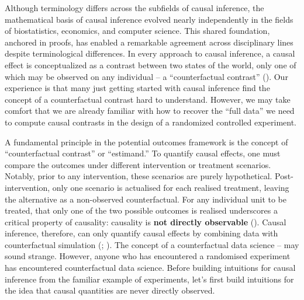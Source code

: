 \documentclass[
  singlecolumn]{article}
\begin{document}
Although terminology differs across the subfields of causal inference,
the mathematical basis of causal inference evolved nearly independently
in the fields of biostatistics, economics, and computer science. This
shared foundation, anchored in proofs, has enabled a remarkable
agreement across disciplinary lines despite terminological differences.
In every approach to causal inference, a causal effect is conceptualized
as a contrast between two states of the world, only one of which may be
observed on any individual -- a ``counterfactual contrast''
(). Our
experience is that many just getting started with causal inference find
the concept of a counterfactual contrast hard to understand. However, we
may take comfort that we are already familiar with how to recover the
``full data'' we need to compute causal contrasts in the design of a
randomized controlled experiment.

A fundamental principle in the potential outcomes framework is the
concept of ``counterfactual contrast'' or ``estimand.'' To quantify
causal effects, one must compare the outcomes under different
intervention or treatment scenarios. Notably, prior to any intervention,
these scenarios are purely hypothetical. Post-intervention, only one
scenario is actualised for each realised treatment, leaving the
alternative as a non-observed counterfactual. For any individual unit to
be treated, that only one of the two possible outcomes is realised
underscores a critical property of causality: causality is \textbf{not
directly observable} (). Causal
inference, therefore, can only quantify causal effects by combining data
with counterfactual simulation (; ). The concept of a counterfactual data science -- may sound
strange. However, anyone who has encountered a randomised experiment has
encountered counterfactual data science. Before building intuitions for
causal inference from the familiar example of experiments, let's first
build intuitions for the idea that causal quantities are never directly
observed.
\end{document}
